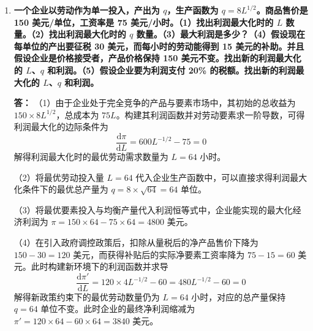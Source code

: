\begin{enumerate}[label=\textbf{\arabic*.}, leftmargin=*]
\begin{center}
		\end{center}
		
		\item \textbf{一个企业以劳动作为单一投入，产出为 $q$，生产函数为 $q = 8L^{1/2}$。商品售价是 150 美元/单位，工资率是 75 美元/小时。（1）找出利润最大化时的 $L$ 数量。（2）找出利润最大化时的 $q$ 数量。（3）最大利润是多少？（4）假设现在每单位的产出要征税 30 美元，而每小时的劳动能得到 15 美元的补助。并且假设企业是价格接受者，产品价格保持 150 美元不变。找出新的利润最大化的 $L$、$q$ 和利润。（5）假设企业要为利润支付 20\% 的税额。找出新的利润最大化的 $L$、$q$ 和利润。}
		
		\textbf{答：}
		（1）由于企业处于完全竞争的产品与要素市场中，其初始的总收益为 $150 \times 8L^{1/2}$，总成本为 $75L$。构建其利润函数并对劳动要素求一阶导数，可得利润最大化的边际条件为
		\[
		\frac{\text{d}\pi}{\text{d}L} = 600L^{-1/2} - 75 = 0
		\]
		解得利润最大化时的最优劳动需求数量为 $L = 64$ 小时。
		
		（2）将最优劳动投入量 $L = 64$ 代入企业生产函数中，可以直接求得利润最大化条件下的最优总产量为 $q = 8 \times \sqrt{64} = 64$ 单位。
		
		（3）将最优要素投入与均衡产量代入利润恒等式中，企业能实现的最大化经济利润为 $\pi = 150 \times 64 - 75 \times 64 = 4800$ 美元。
		
		（4）在引入政府调控政策后，扣除从量税后的净产品售价下降为 $150 - 30 = 120$ 美元，而获得补贴后的实际净要素工资率降为 $75 - 15 = 60$ 美元。此时构建新环境下的利润函数并求导
		\[
		\frac{\text{d}\pi'}{\text{d}L} = 120 \times 4L^{-1/2} - 60 = 480L^{-1/2} - 60 = 0
		\]
		解得新政策约束下的最优劳动数量仍为 $L = 64$ 小时，对应的总产量保持 $q = 64$ 单位不变。此时企业的最终净利润缩减为 $\pi' = 120 \times 64 - 60 \times 64 = 3840$ 美元。
		

\end{enumerate}
